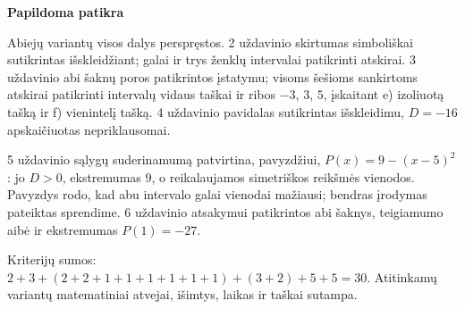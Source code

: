 \documentclass[11pt]{article}
\newcommand{\sk}[1]{\par\medskip\textbf{#1}\par}
\begin{document}
\sk{Papildoma patikra}
Abiejų variantų visos dalys perspręstos. 2 uždavinio skirtumas simboliškai sutikrintas išskleidžiant; galai ir trys ženklų intervalai patikrinti atskirai. 3 uždavinio abi šaknų poros patikrintos įstatymu; visoms šešioms sankirtoms atskirai patikrinti intervalų vidaus taškai ir ribos $-3$, $3$, $5$, įskaitant e) izoliuotą tašką ir f) vienintelį tašką. 4 uždavinio pavidalas sutikrintas išskleidimu, $D=-16$ apskaičiuotas nepriklausomai.

5 uždavinio sąlygų suderinamumą patvirtina, pavyzdžiui, $P(x)=9-(x-5)^2$: jo $D>0$, ekstremumas $9$, o reikalaujamos simetriškos reikšmės vienodos. Pavyzdys rodo, kad abu intervalo galai vienodai mažiausi; bendras įrodymas pateiktas sprendime. 6 uždavinio atsakymui patikrintos abi šaknys, teigiamumo aibė ir ekstremumas $P(1)=-27$.

Kriterijų sumos: $2+3+(2+2+1+1+1+1+1+1)+(3+2)+5+5=30$. Atitinkamų variantų matematiniai atvejai, išimtys, laikas ir taškai sutampa.
\end{document}
